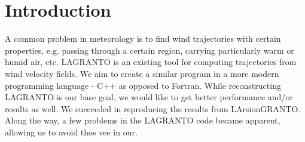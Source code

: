 \setcounter{chapter}{0}

\chapter{Introduction}

A common problem in meteorology is to find wind trajectories with certain properties, e.g. passing through a certain region, carrying particularly warm or humid air, etc.
LAGRANTO is an existing tool for computing trajectories from wind velocity fields. We aim to create a similar program in a more modern programming language - C++ as opposed to Fortran. While reconstructing LAGRANTO is our base goal, we would like to get better performance and/or results as well.
We succeeded in reproducing the results from LArsionGRANTO. Along the way, a few problems in the LAGRANTO code became apparent, allowing us to avoid thos vee in our.